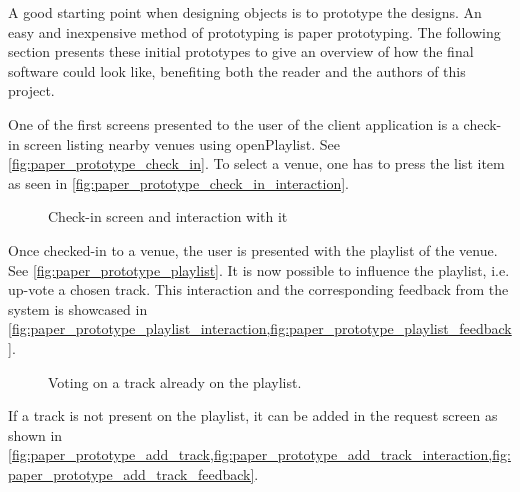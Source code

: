 \label{paper_prototype}
A good starting point when designing objects is to prototype the
designs. An easy and inexpensive method of prototyping is paper
prototyping. The following section presents these initial prototypes
to give an overview of how the final software could look like,
benefiting both the reader and the authors of this project.

One of the first screens presented to the user of the client
application is a check-in screen listing nearby venues using
openPlaylist. See \cref{fig:paper_prototype_check_in}. To select a
venue, one has to press the list item as seen in \cref{fig:paper_prototype_check_in_interaction}.

\begin{figure}[htbp]
  \centering
  \caption{Check-in screen and interaction with it}
\end{figure}


Once checked-in to a venue, the user is presented with the playlist of
the venue. See \cref{fig:paper_prototype_playlist}. It is now possible
to influence the playlist, i.e. up-vote a chosen track. This
interaction and the corresponding feedback from the system is showcased in
\cref{fig:paper_prototype_playlist_interaction,fig:paper_prototype_playlist_feedback}.

\begin{figure}[htbp]
  \centering
  \caption{Voting on a track already on the playlist.}
\end{figure}

If a track is not present on the playlist, it can be added in the
request screen as shown in
\cref{fig:paper_prototype_add_track,fig:paper_prototype_add_track_interaction,fig:paper_prototype_add_track_feedback}.


